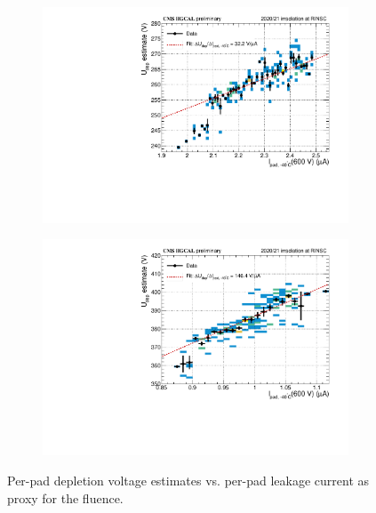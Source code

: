 \begin{figure}
	\captionsetup[subfigure]{aboveskip=-1pt,belowskip=-1pt}
	\centering
	\begin{subfigure}[b]{0.49\textwidth}
		\centering
		\includegraphics[width=0.999\textwidth]{plots/Vdep_vs_fluence/Vdep_vs_current_5414.pdf}
		\subcaption{
			}
			\label{plot:Vdep_hexplot_0541_04}
	\end{subfigure}
	\hfill
	\begin{subfigure}[b]{0.49\textwidth}
		\centering
		\includegraphics[width=0.999\textwidth]{plots/Vdep_vs_fluence/Vdep_vs_current_1002.pdf}
		\subcaption{
		}
		\label{plot:Vdep_hexplot_1002}
	\end{subfigure}	
	\caption{
		Per-pad depletion voltage estimates vs. per-pad leakage current as proxy for the fluence.
	}
\end{figure}

\label{subsec:irradiation_Vdep}
